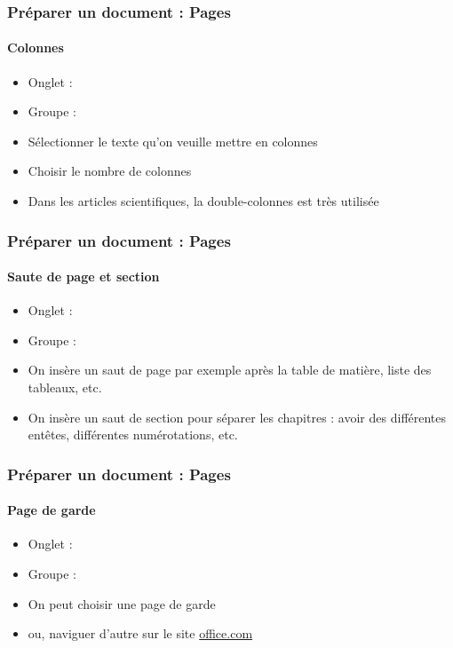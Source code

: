 \documentclass[xcolor=table]{beamer}
\begin{document}
\begin{frame}[t]
\frametitle{Préparer un document : Pages}
\framesubtitle{Colonnes}

\begin{minipage}{0.44\textwidth}
	\begin{itemize}
		\item Onglet : 
		\item Groupe : 
		\item Sélectionner le texte qu'on veuille mettre en colonnes
		\item Choisir le nombre de colonnes 
		\item Dans les articles scientifiques, la double-colonnes est très utilisée
	\end{itemize}
\end{minipage}
\begin{minipage}{0.55\textwidth}
\end{minipage}

\end{frame}

\begin{frame}[t]
\frametitle{Préparer un document : Pages}
\framesubtitle{Saute de page et section}

\begin{minipage}{0.44\textwidth}
	\begin{itemize}
		\item Onglet : 
		\item Groupe : 
		\item On insère un saut de page par exemple après la table de matière, liste des tableaux, etc.
		\item On insère un saut de section pour séparer les chapitres : avoir des différentes entêtes, différentes numérotations, etc.
	\end{itemize}
\end{minipage}
\begin{minipage}{0.55\textwidth}
\end{minipage}

\end{frame}

\begin{frame}[t]
\frametitle{Préparer un document : Pages}
\framesubtitle{Page de garde}

\begin{minipage}{0.49\textwidth}
	\begin{itemize}
		\item Onglet : 
		\item Groupe : 
		\item On peut choisir une page de garde
		\item ou, naviguer d'autre sur le site \url{office.com}
	\end{itemize}
\end{minipage}
\begin{minipage}{0.50\textwidth}
\end{minipage}

\end{frame}
\end{document}
